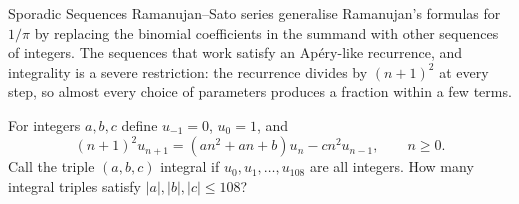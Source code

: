 \begin{problem}{Sporadic Sequences}
Ramanujan--Sato series generalise Ramanujan's formulas for \(1/\pi\) by replacing the binomial coefficients in the summand with other sequences of integers. The sequences that work satisfy an Apéry-like recurrence, and integrality is a severe restriction: the recurrence divides by \((n+1)^2\) at every step, so almost every choice of parameters produces a fraction within a few terms.

For integers \(a,b,c\) define \(u_{-1}=0\), \(u_0=1\), and
    \[
    (n+1)^2u_{n+1}=(an^2+an+b)u_n-cn^2u_{n-1},
    \qquad n\ge0.
    \]
Call the triple \((a,b,c)\) integral if \(u_0,u_1,\dots,u_{108}\) are all integers. How many integral triples satisfy \(|a|,|b|,|c|\le108\)?
\end{problem}